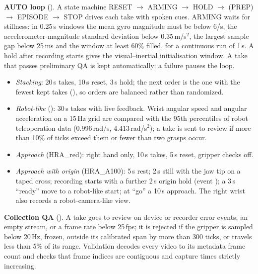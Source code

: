 \documentclass[conference,10pt]{IEEEtran}
\begin{document}
\textbf{AUTO loop} (). A state machine RESET $\to$ ARMING $\to$ HOLD $\to$ (PREP) $\to$ EPISODE
$\to$ STOP drives each take with spoken cues. ARMING waits for stillness: in 0.25\,s windows the mean gyro magnitude must be
below 6\textdegree/s, the accelerometer-magnitude standard deviation below 0.35\,m/s$^2$, the largest sample gap below 25\,ms and
the window at least 60\% filled, for a continuous run of 1\,s. A hold after recording starts gives the visual--inertial
initialisation window. A take that passes preliminary QA is kept automatically; a failure pauses the loop.
\begin{itemize}
\item \emph{Stacking}: 20\,s takes, 10\,s reset, 3\,s hold; the next order is the one with the fewest kept takes
(), so orders are balanced rather than randomized.
\item \emph{Robot-like} (): 30\,s takes with live feedback. Wrist angular speed and angular acceleration
on a 15\,Hz grid are compared with the 95th percentiles of robot teleoperation data (0.996\,rad/s, 4.413\,rad/s$^2$); a take is
sent to review if more than 10\% of ticks exceed them or fewer than two grasps occur.
\item \emph{Approach} (HRA\_red): right hand only, 10\,s takes, 5\,s reset, gripper checks off.
\item \emph{Approach with origin} (HRA\_A100): 5\,s rest; 2\,s still with the jaw tip on a taped cross; recording starts with a
further 2\,s origin hold (event ); a 3\,s ``ready'' move to a robot-like start; at ``go'' a 10\,s approach. The
right wrist also records a robot-camera-like view.
\end{itemize}

\textbf{Collection QA} (). A take goes to review on device or recorder error events, an empty
stream, or a frame rate below 25\,fps; it is rejected if the gripper is sampled below 20\,Hz, frozen, outside its calibrated
span by more than 300 ticks, or travels less than 5\% of its range. Validation decodes every video to its metadata frame count
and checks that frame indices are contiguous and capture times strictly increasing.
\end{document}
